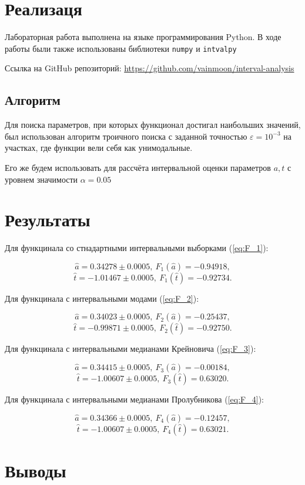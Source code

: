 \documentclass{article}
\begin{document}
  \section{Реализаця}

  Лабораторная работа выполнена на языке программирования Python. В ходе
  работы были также использованы библиотеки \verb!numpy! и \verb!intvalpy!

  Ссылка на GitHub репозиторий:
  \url{https://github.com/vainmoon/interval-analysis}

  \subsection{Алгоритм}

  Для поиска параметров, при которых функционал достигал наибольших
  значений, был использован алгоритм троичного поиска с заданной точностью
  \( \varepsilon = 10^{-3} \) на участках, где функции вели
  себя как унимодальные.

  Его же будем использовать для рассчёта интервальной оценки параметров \( a, t\) с уровнем значимости \( \alpha = 0.05 \)

  \section{Результаты}

  Для функцинала со стнадартными интервальными выборками (\ref{eq:F_1}):

  \[ \hat a = 0.34278 \pm 0.0005, \ F_1 (\hat a) = -0.94918, \]
  \[ \hat t = -1.01467 \pm 0.0005, \ F_1 (\hat t) = -0.92734. \]

  Для функцинала с интервальными модами (\ref{eq:F_2}):

  \[ \hat a = 0.34023 \pm 0.0005, \ F_2 (\hat a) = -0.25437, \]
  \[ \hat t = -0.99871 \pm 0.0005, \ F_2 (\hat t) = -0.92750. \]

  Для функцинала с интервальными медианами Крейновича (\ref{eq:F_3}):

  \[ \hat a = 0.34415 \pm 0.0005, \ F_3 (\hat a) = -0.00184, \]
  \[ \hat t = -1.00607 \pm 0.0005, \ F_3 (\hat t) = 0.63020. \]

  Для функцинала с интервальными медианами Пролубникова (\ref{eq:F_4}):

  \[ \hat a = 0.34366 \pm 0.0005, \ F_4 (\hat a) = -0.12457, \]
  \[ \hat t = -1.00607 \pm 0.0005, \ F_4 (\hat t) = 0.63021. \]
  \section{Выводы}
\end{document}

